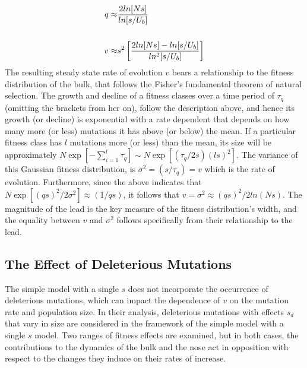 \documentclass[12pt]{article}
\begin{document}
\begin{equation}
\begin{aligned}
q \approx & {2ln[Ns] \over ln[s/U_b]} \\   
\\
v \approx & s^2 \left[{2ln[Ns] - ln[s/U_b] \over ln^2[s/U_b]}\right]
\end{aligned}
\end{equation} 
The resulting steady state rate of evolution $v$ bears a relationship to the fitness distribution of the bulk, that follows the Fisher's fundamental theorem of natural selection.  The growth and decline of a fitness classes over a time period of $\tau_q$ (omitting the brackets from her on), follow the description above, and hence its growth (or decline) is exponential with a rate dependent that depends on how many more (or less) mutations it has above (or below) the mean.  If a particular fitness class has $l$ mutations  more (or less) than the mean, its size will be approximately $N \exp[-\sum_{i=1}^{l} \tau_q] \sim N \exp[(\tau_q/2s)(ls)^2]$.  The variance of this Gaussian fitness distribution, is $\sigma^2 = (s/\tau_q)=v$ which is the rate of evolution.  Furthermore, since the above indicates that $N \exp[(qs)^2/2\sigma^2]\approx (1/qs)$, it follows that $v=\sigma^2 \approx (qs)^2/2ln(Ns)$.  The magnitude of the lead is the key measure of the fitness distribution's width, and the equality between $v$ and $\sigma^2$ follows specifically from their relationship to the lead.

\subsection*{The Effect of Deleterious Mutations}
The simple model with a single $s$ does not incorporate the occurrence of deleterious mutations, which can impact the dependence of $v$ on the mutation rate and population size.  In their analysis, deleterious mutations with effects $s_d$ that vary in size are considered in the framework of the simple model with a single $s$ model.  Two ranges of fitness effects are examined, but in both cases, the contributions to the dynamics of the bulk and the nose act in opposition with respect to the changes they induce on their rates of increase.   
\end{document}
